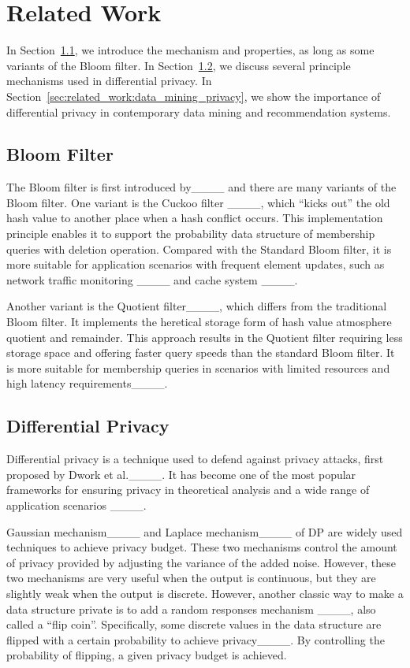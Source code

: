 \section{Related Work}
\label{sec:related_work}

In Section~\ref{sec:related_word:bloom_filter}, we introduce the mechanism and properties, as long as some variants of the Bloom filter.
In Section~\ref{sec:related_work:dp}, we discuss several principle mechanisms used in differential privacy.
In Section~\ref{sec:related_work:data_mining_privacy}, we show the importance of differential privacy in contemporary data mining and recommendation systems. 

\subsection{Bloom Filter} \label{sec:related_word:bloom_filter}


The Bloom filter is first introduced by____ and 
there are many variants of the Bloom filter. One variant is the Cuckoo filter ____, which ``kicks out'' the old hash value to another place when a hash conflict occurs. This implementation principle enables it to support the probability data structure of membership queries with deletion operation. Compared with the Standard Bloom filter, it is more suitable for application scenarios with frequent element updates, such as network traffic monitoring ____ and cache system ____.

Another variant is the Quotient filter____, which differs from the traditional Bloom filter. It implements the heretical storage form of hash value atmosphere quotient and remainder. 
This approach results in the Quotient filter requiring less storage space and offering faster query speeds than the standard Bloom filter.
It is more suitable for membership queries in scenarios with limited resources and high latency requirements____.

\subsection{Differential Privacy} \label{sec:related_work:dp}

Differential privacy is a technique used to defend against privacy attacks, first proposed 
by Dwork et al.____. It has become one of the most popular frameworks for ensuring privacy in theoretical analysis and a wide range of application scenarios 
____. 

Gaussian mechanism____ and Laplace mechanism____ of DP are widely used techniques to achieve privacy budget. 
These two mechanisms control the amount of privacy provided by adjusting the variance of the added noise. However, these two mechanisms are very useful when the output is continuous, but they are slightly weak when the output is discrete.
However, another classic way to make a data structure private is to add a random responses mechanism ____, also called a ``flip coin''. Specifically, some discrete values in the data structure are flipped with a certain probability to achieve privacy____. 
By controlling the probability of flipping, a given privacy budget is achieved.

